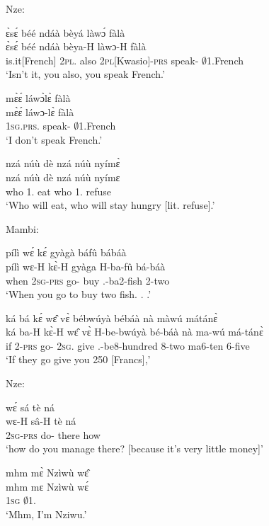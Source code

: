 \noindent Nze:

\begin{exe}[(C234)] 
\exC\label{240} 
  \glll  ɛ̀sɛ́ béé ndáà bèyá làwɔ́ fàlà \\
       ɛ̀sɛ́ béé ndáà bèya-H làwɔ-H fàlà \\
        is.it[French] 2\textsc{pl}.{\SBJ}  also 2\textsc{pl}[Kwasio]-\textsc{prs} speak-{\R} $\emptyset$1.French  \\
    \trans `Isn't it, you also, you speak French.'
 
\exC\label{241} 
  \glll  mɛ̀ɛ́ láwɔ̀lɛ̀ fàlà \\
        mɛ̀ɛ́ láwɔ-lɛ̀ fàlà \\
         1\textsc{sg}.\textsc{prs}.{\NEG} speak-{\NEG} $\emptyset$1.French \\
    \trans `I don't speak French.'
 
\exC\label{242}
  \glll nzá núù dè nzá núù nyímɛ̀ \\
         nzá núù dè nzá núù nyímɛ \\
       who 1.{\FUT} eat who 1.{\FUT} refuse   \\
    \trans `Who will eat, who will stay hungry [lit. refuse].'
\end{exe}

\noindent Mambi:

\begin{exe}[(C234)]  
\exC\label{243} 
  \glll  pílì wɛ́ kɛ́ gyàgà báfû bábáà \\
        pílì wɛ-H kɛ̀-H gyàga H-ba-fû bá-báà \\
        when 2\textsc{sg}-\textsc{prs} go-{\R} buy {\OBJ}.{\LINK}-ba2-fish 2-two  \\
    \trans `When you go to buy two fish. . .'
 
\exC\label{244}
  \glll ká bá kɛ́ wɛ̂ vɛ̀ bébwúyà bébáà nà màwú mátánɛ̀ \\
      ká ba-H kɛ̀-H wɛ̂ vɛ̀ H-be-bwúyà bé-báà nà ma-wú má-tánɛ̀ \\
        if 2-\textsc{prs} go-{\R} 2\textsc{sg}.{\OBJ} give {\OBJ}.{\LINK}-be8-hundred 8-two {\CONJ} ma6-ten 6-five  \\
    \trans `If they go give you 250 [Francs],'
\end{exe}

\noindent Nze:

\begin{exe}[(C234)] 
\exC\label{245} 
  \glll wɛ́ sá tè ná  \\
        wɛ-H sâ-H tè ná \\
        2\textsc{sg}-\textsc{prs} do-{\R} there how \\
    \trans `how do you manage there? [because it's very little money]'
 
\exC\label{246} 
  \glll  mhm mɛ̀ Nzìwù wɛ̂\\
         mhm mɛ Nzìwù wɛ́ \\
       {\EXCL} 1\textsc{sg} $\emptyset$1.{\PN}  {\ID}  \\
    \trans `Mhm, I'm Nziwu.'
\end{exe}

